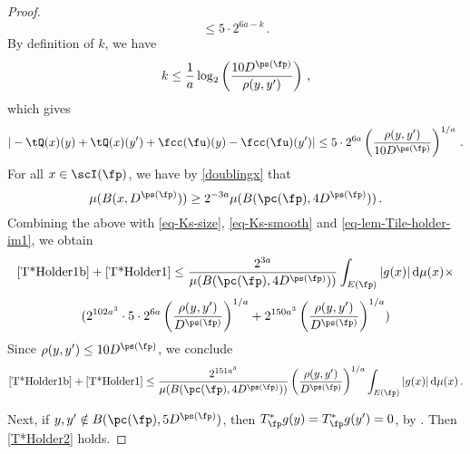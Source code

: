 \begin{proof}
        $$
            \le 5 \cdot 2^{6a - k}\,.
        $$
        By definition of $k$, we have
        $$
            k \le \frac{1}{a} \log_2\left(\frac{10 D^{\ps(\fp)}}{\rho(y,y')}\right)\,,
        $$
        which gives
        \begin{equation}
            \label{eq-lem-Tile-holder-im1}
             |-\tQ(x)(y) + \tQ(x)(y') + \fcc(\fu)(y) - \fcc(\fu)(y')| \le 5 \cdot 2^{6a} \left(\frac{\rho(y,y')}{10 D^{\ps(\fp)}}\right)^{1/a}\,.
        \end{equation}
        For all $x \in \scI(\fp)$, we have by \eqref{doublingx} that
        $$
            \mu(B(x, D^{\ps(\fp)})) \ge 2^{-3a} \mu(B(\pc(\fp), 4D^{\ps(\fp)}))\,.
        $$
        Combining the above with \eqref{eq-Ks-size}, \eqref{eq-Ks-smooth} and \eqref{eq-lem-Tile-holder-im1},
        we obtain
        $$
            \eqref{T*Holder1b}+\eqref{T*Holder1} \le \frac{2^{3a}}{\mu(B(\pc(\fp), 4D^{\ps(\fp)}))} \int_{E(\fp)}|g(x)| \, \mathrm{d}\mu(x) \times
        $$
        $$
            (2^{102a^3} \cdot 5 \cdot 2^{6a} \left(\frac{\rho(y,y')}{ D^{\ps(\fp)}}\right)^{1/a} + 2^{150a^3} \left(\frac{\rho(y,y')}{D^{\ps(\fp)}}\right)^{1/a})
        $$
        Since $\rho(y,y') \le 10 D^{\ps(\fp)}$, we conclude
        $$
            \eqref{T*Holder1b}+\eqref{T*Holder1} \le \frac{2^{151a^3}}{\mu(B(\pc(\fp), 4D^{\ps(\fp)}))} \left(\frac{\rho(y,y')}{D^{\ps(\fp)}}\right)^{1/a} \int_{E(\fp)}|g(x)| \, \mathrm{d}\mu(x)\,.
        $$

        Next, if $y,y' \notin B(\pc(\fp), 5D^{\ps(\fp)})$, then $T_{\fp}^*g(y) = T_{\fp}^*g(y') = 0$, by . Then \eqref{T*Holder2} holds.


\end{proof}
